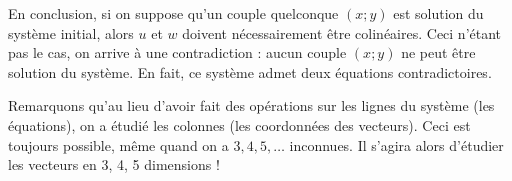 {\begin{enumerate}
		En conclusion, si on suppose qu'un couple quelconque $(x;y)$ est solution du système initial, alors $u$ et $w$ doivent nécessairement être colinéaires.
		Ceci n'étant pas le cas, on arrive à une contradiction : aucun couple $(x;y)$ ne peut être solution du système.
		En fait, ce système admet deux équations contradictoires.

		Remarquons qu'au lieu d'avoir fait des opérations sur les lignes du système (les équations), on a étudié les colonnes (les coordonnées des vecteurs).
		Ceci est toujours possible, même quand on a $3, 4, 5, \dots$ inconnues. Il s'agira alors d'étudier les vecteurs en 3, 4, 5 dimensions !
	\end{enumerate}

}



